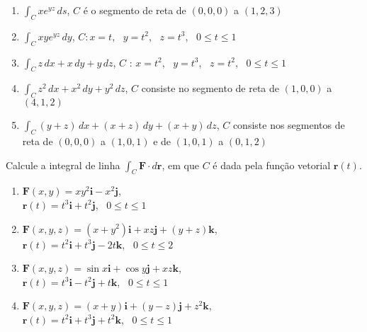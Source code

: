 \documentclass[a4paper, 12pt]{article}
\begin{document}
\begin{enumerate}
		\item $\displaystyle \int_C xe^{yz} \, ds$, \quad $C$ é o segmento de reta de $(0,0,0)$ a $(1,2,3)$

		\item $\displaystyle \int_C xye^{yz} \, dy$, \quad $C: x = t$, \, $y = t^2$, \, $z = t^3$, \, $0 \leq t \leq 1$

		\item $\displaystyle \int_C z \, dx + x \, dy + y \, dz$, \quad $C$ : $x = t^2$, \, $y = t^3$, \, $z = t^2$, \, $0 \leq t \leq 1$

		\item $\displaystyle \int_C z^2 \, dx + x^2 \, dy + y^2 \, dz$, \quad $C$ consiste no segmento de reta de $(1,0,0)$ a $(4,1,2)$

		\item $\displaystyle \int_C (y + z) \, dx + (x + z) \, dy + (x + y) \, dz$, \quad $C$ consiste nos segmentos de reta de $(0,0,0)$ a $(1,0,1)$ e de $(1,0,1)$ a $(0,1,2)$
	
	\end{enumerate}
	
	\vspace{5mm}
	
	Calcule a integral de linha $\displaystyle \int_C \textbf{F} \cdot d\textbf{r}$, em que $C$ é dada pela função vetorial $\textbf{r}(t)$.
	
	\begin{enumerate}[resume]
	
		\item $\textbf{F}(x,y) = xy^{2}\textbf{i} - x^{2}\textbf{j}$, \\ $\textbf{r}(t) = t^{3}\textbf{i} + t^{2}\textbf{j}$, \, $0 \leq t \leq 1$

		\item $\textbf{F}(x,y,z) = (x + y^2)\textbf{i} + xz\textbf{j} + (y + z)\textbf{k}$, \\ $\textbf{r}(t) = t^{2}\textbf{i} + t^{3}\textbf{j} - 2t\textbf{k}$, \, $0 \leq t \leq 2$

		\item $\textbf{F}(x,y,z) = \sin{x}\textbf{i} + \cos{y}\textbf{j} + xz\textbf{k}$, \\ $\textbf{r}(t) = t^{3}\textbf{i} - t^{2}\textbf{j} + t\textbf{k}$, \, $0 \leq t \leq 1$

		\item $\textbf{F}(x,y,z) = (x + y)\textbf{i} + (y - z)\textbf{j} + z^2\textbf{k}$, \\ $\textbf{r}(t) = t^{2}\textbf{i} + t^{3}\textbf{j} + t^{2}\textbf{k}$, \, $0 \leq t \leq 1$
	
	\end{enumerate}
		
	\vspace{5mm}	
	
\end{document}
